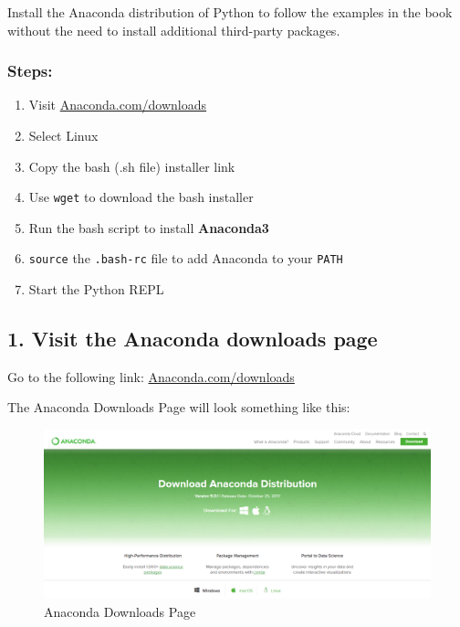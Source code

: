 \documentclass{book}
\makeatletter
\def\maxwidth{\ifdim\Gin@nat@width>\linewidth\linewidth
    \else\Gin@nat@width\fi}
\let\Oldincludegraphics\includegraphics
\renewcommand{\includegraphics}[1]{\Oldincludegraphics[width=.8\maxwidth]{#1}}
\makeatother
\begin{document}
Install the Anaconda distribution of Python to follow the examples in
the book without the need to install additional third-party packages.
    




    
        \subsubsection{Steps:}\label{steps}

\begin{enumerate}
\def\labelenumi{\arabic{enumi}.}
\item
  Visit
  \href{https://www.anaconda.com/download/}{Anaconda.com/downloads}
\item
  Select Linux
\item
  Copy the bash (.sh file) installer link
\item
  Use \lstinline!wget! to download the bash installer
\item
  Run the bash script to install \textbf{Anaconda3}
\item
  \lstinline!source! the \lstinline!.bash-rc! file to add Anaconda to
  your \lstinline!PATH!
\item
  Start the Python REPL
\end{enumerate}
    




    
        \subsection{1. Visit the Anaconda downloads
page}\label{visit-the-anaconda-downloads-page}

Go to the following link:
\href{https://www.anaconda.com/download/}{Anaconda.com/downloads}

The Anaconda Downloads Page will look something like this:

\begin{figure}
\centering
\includegraphics{images/anaconda_download_page.png}
\caption{Anaconda Downloads Page}
\end{figure}
    
\end{document}

